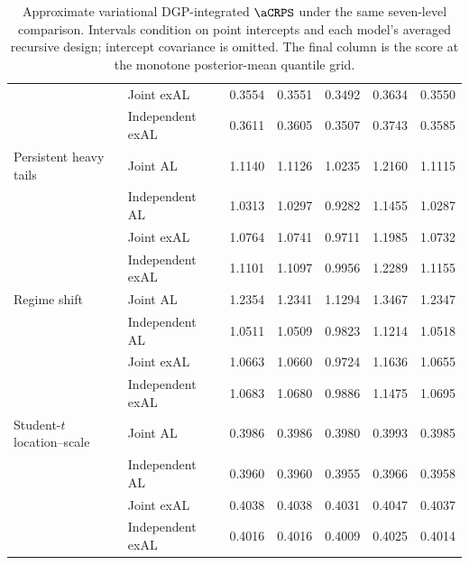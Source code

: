 \begin{table}[p]
{\begin{tabular}{@{}>{\raggedright\arraybackslash}p{}>{\raggedright\arraybackslash}p{}rrrrr@{}}
 & Joint exAL & 0.3554 & 0.3551 & 0.3492 & 0.3634 & 0.3550 \\
 & Independent exAL & 0.3611 & 0.3605 & 0.3507 & 0.3743 & 0.3585 \\
\addlinespace[2pt]
Persistent heavy tails & Joint AL & 1.1140 & 1.1126 & 1.0235 & 1.2160 & 1.1115 \\
 & Independent AL & 1.0313 & 1.0297 & 0.9282 & 1.1455 & 1.0287 \\
 & Joint exAL & 1.0764 & 1.0741 & 0.9711 & 1.1985 & 1.0732 \\
 & Independent exAL & 1.1101 & 1.1097 & 0.9956 & 1.2289 & 1.1155 \\
\addlinespace[2pt]
Regime shift & Joint AL & 1.2354 & 1.2341 & 1.1294 & 1.3467 & 1.2347 \\
 & Independent AL & 1.0511 & 1.0509 & 0.9823 & 1.1214 & 1.0518 \\
 & Joint exAL & 1.0663 & 1.0660 & 0.9724 & 1.1636 & 1.0655 \\
 & Independent exAL & 1.0683 & 1.0680 & 0.9886 & 1.1475 & 1.0695 \\
\addlinespace[2pt]
Student-\(t\) location--scale & Joint AL & 0.3986 & 0.3986 & 0.3980 & 0.3993 & 0.3985 \\
 & Independent AL & 0.3960 & 0.3960 & 0.3955 & 0.3966 & 0.3958 \\
 & Joint exAL & 0.4038 & 0.4038 & 0.4031 & 0.4047 & 0.4037 \\
 & Independent exAL & 0.4016 & 0.4016 & 0.4009 & 0.4025 & 0.4014 \\
\bottomrule
\end{tabular}
}%
\caption{Approximate variational DGP-integrated \(\aCRPS\) under the same seven-level comparison. Intervals condition on point intercepts and each model's averaged recursive design; intercept covariance is omitted. The final column is the score at the monotone posterior-mean quantile grid.}
\label{tab:joint-qdesn-pure-desn-v1-vb-score}
\end{table}
